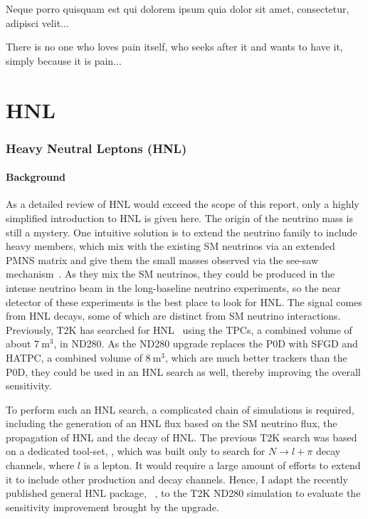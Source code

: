 \begin{savequote}[8cm]
\textlatin{Neque porro quisquam est qui dolorem ipsum quia dolor sit amet, consectetur, adipisci velit...}

There is no one who loves pain itself, who seeks after it and wants to have it, simply because it is pain...
\end{savequote}

\chapter{\label{ch:6-hnl}HNL} 

\minitoc


    \subsection{Heavy Neutral Leptons (HNL)}
    \subsubsection{Background}
        As a detailed review of HNL would exceed the scope of this report, only a highly simplified introduction to HNL is given here. 
        The origin of the neutrino mass is still a mystery. 
        One intuitive solution is to extend the neutrino family to include heavy members, which mix with the existing SM neutrinos via an extended PMNS matrix and give them the small masses observed via the see-saw mechanism~\cite{Abada_2007}. 
        As they mix the SM neutrinos, they could be produced in the intense neutrino beam in the long-baseline neutrino experiments, so the near detector of these experiments is the best place to look for HNL. 
        The signal comes from HNL decays, some of which are distinct from SM neutrino interactions. 
        Previously, T2K has searched for HNL~\cite{T2K:2019jwa} using the TPCs, a combined volume of about $7~\textrm{m}^3$, in ND280. As 
        the ND280 upgrade replaces the P0D with SFGD and HATPC, a combined volume of $8~\textrm{m}^3$, which are much better trackers than the P0D, they could be used in an HNL search as well, thereby improving the overall sensitivity. 

        To perform such an HNL search, a complicated chain of simulations is required, including the generation of an HNL flux based on the SM neutrino flux, the propagation of HNL and the decay of HNL. 
        The previous T2K search was based on a dedicated tool-set, , which was built only to search for $N\rightarrow l + \pi$ decay channels, where $l$ is a lepton. 
        It would require a large amount of efforts to extend it to include other production and decay channels. 
        Hence, I adapt the recently published general HNL package, ~\cite{Plows:2022gxc}, to the T2K ND280 simulation to evaluate the sensitivity improvement brought by the upgrade.

